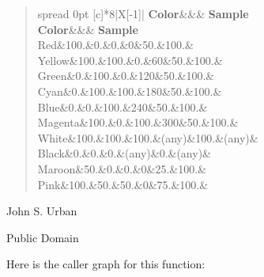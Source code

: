 \begin{DoxyDescription}
\begin{quote}
\tabulinesep=1mm
\begin{longtabu} spread 0pt [c]{*{8}{|X[-1]}|}
\hline
\rowcolor{\tableheadbgcolor}\textbf{ Color}&&&\textbf{ Sample }\\
\endfirsthead
\hline
\endfoot
\hline
\rowcolor{\tableheadbgcolor}\textbf{ Color}&&&\textbf{ Sample }\\
\endhead
Red&100.&0.&0.&0&50.&100.&~ \\
Yellow&100.&100.&0.&60&50.&100.&~ \\
Green&0.&100.&0.&120&50.&100.&~ \\
Cyan&0.&100.&100.&180&50.&100.&~ \\
Blue&0.&0.&100.&240&50.&100.&~ \\
Magenta&100.&0.&100.&300&50.&100.&~ \\
White&100.&100.&100.&(any)&100.&(any)&~ \\
Black&0.&0.&0.&(any)&0.&(any)&~ \\
Maroon&50.&0.&0.&0&25.&100.&~ \\
Pink&100.&50.&50.&0&75.&100.&~ \\
\end{longtabu}
\end{quote}



\item[A\+U\+T\+H\+OR ]

John S. Urban




\item[L\+I\+C\+E\+N\+SE ]

Public Domain




\end{DoxyDescription}Here is the caller graph for this function\+:
